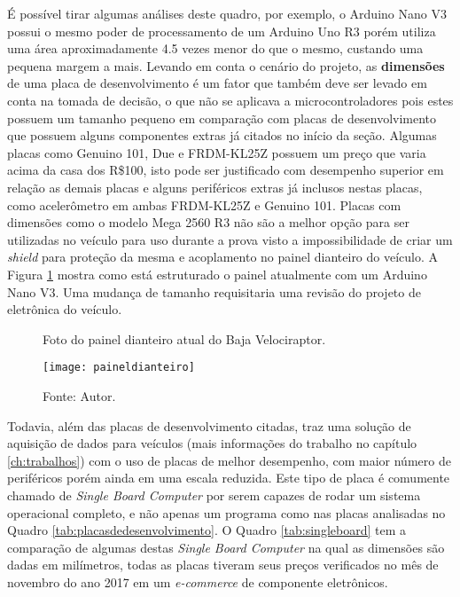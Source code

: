 É possível tirar algumas análises deste quadro, por exemplo, o Arduino Nano V3 possui o mesmo poder de processamento de um Arduino Uno R3 porém utiliza uma área aproximadamente 4.5 vezes menor do que o mesmo, custando uma pequena margem a mais. Levando em conta o cenário do projeto, as \textbf{dimensões} de uma placa de desenvolvimento é um fator que também deve ser levado em conta na tomada de decisão, o que não se aplicava a microcontroladores pois estes possuem um tamanho pequeno em comparação com placas de desenvolvimento que possuem alguns componentes extras já citados no início da seção. Algumas placas como Genuino 101, Due e FRDM-KL25Z possuem um preço que varia acima da casa dos R\$100, isto pode ser justificado com desempenho superior em relação as demais placas e alguns periféricos extras já inclusos nestas placas, como acelerômetro em ambas FRDM-KL25Z e Genuino 101. Placas com dimensões como o modelo Mega 2560 R3 não são a melhor opção para ser utilizadas no veículo para uso durante a prova visto a impossibilidade de criar um \textit{shield} para proteção da mesma e acoplamento no painel dianteiro do veículo. A Figura \ref{fig:paineldianteiro} mostra como está estruturado o painel atualmente com um Arduino Nano V3. Uma mudança de tamanho requisitaria uma revisão do projeto de eletrônica do veículo.

\begin{figure}[!htb]
	\centering
		\caption{Foto do painel dianteiro atual do Baja Velociraptor.}
		\texttt{[image: paineldianteiro]} 
		\caption*{Fonte: Autor.}
		\label{fig:paineldianteiro}
\end{figure} 
     

Todavia, além das placas de desenvolvimento citadas,  traz uma solução de aquisição de dados para veículos (mais informações do trabalho no capítulo \ref{ch:trabalhos}) com o uso de placas de melhor desempenho, com maior número de periféricos porém ainda em uma escala reduzida. Este tipo de placa é comumente chamado de \textit{Single Board Computer} por serem capazes de rodar um sistema operacional completo, e não apenas um programa como nas placas analisadas no Quadro \ref{tab:placasdedesenvolvimento}. O Quadro \ref{tab:singleboard} tem a comparação de algumas destas \textit{Single Board Computer} na qual as dimensões são dadas em milímetros, todas as placas tiveram seus preços verificados no mês de novembro do ano 2017 em um \textit{e-commerce} de componente eletrônicos\cite{filipeflop}.

